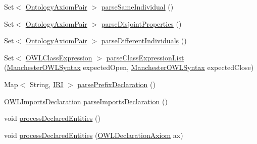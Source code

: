\begin{DoxyCompactItemize}
\item 
Set$<$ \hyperlink{classorg_1_1coode_1_1owlapi_1_1manchesterowlsyntax_1_1_ontology_axiom_pair}{Ontology\-Axiom\-Pair} $>$ \hyperlink{classorg_1_1coode_1_1owlapi_1_1manchesterowlsyntax_1_1_manchester_o_w_l_syntax_editor_parser_a6c2b270d7163b4156eeac5839ff7728a}{parse\-Same\-Individual} ()
\item 
Set$<$ \hyperlink{classorg_1_1coode_1_1owlapi_1_1manchesterowlsyntax_1_1_ontology_axiom_pair}{Ontology\-Axiom\-Pair} $>$ \hyperlink{classorg_1_1coode_1_1owlapi_1_1manchesterowlsyntax_1_1_manchester_o_w_l_syntax_editor_parser_a5896329f8f4aece049291391224239c0}{parse\-Disjoint\-Properties} ()
\item 
Set$<$ \hyperlink{classorg_1_1coode_1_1owlapi_1_1manchesterowlsyntax_1_1_ontology_axiom_pair}{Ontology\-Axiom\-Pair} $>$ \hyperlink{classorg_1_1coode_1_1owlapi_1_1manchesterowlsyntax_1_1_manchester_o_w_l_syntax_editor_parser_a194d6d1b4588538aa9a00e3279ff4821}{parse\-Different\-Individuals} ()
\item 
Set$<$ \hyperlink{interfaceorg_1_1semanticweb_1_1owlapi_1_1model_1_1_o_w_l_class_expression}{O\-W\-L\-Class\-Expression} $>$ \hyperlink{classorg_1_1coode_1_1owlapi_1_1manchesterowlsyntax_1_1_manchester_o_w_l_syntax_editor_parser_a515a71c10afb8d0d15b0db9d9b97407a}{parse\-Class\-Expression\-List} (\hyperlink{enumorg_1_1coode_1_1owlapi_1_1manchesterowlsyntax_1_1_manchester_o_w_l_syntax}{Manchester\-O\-W\-L\-Syntax} expected\-Open, \hyperlink{enumorg_1_1coode_1_1owlapi_1_1manchesterowlsyntax_1_1_manchester_o_w_l_syntax}{Manchester\-O\-W\-L\-Syntax} expected\-Close)
\item 
Map$<$ String, \hyperlink{classorg_1_1semanticweb_1_1owlapi_1_1model_1_1_i_r_i}{I\-R\-I} $>$ \hyperlink{classorg_1_1coode_1_1owlapi_1_1manchesterowlsyntax_1_1_manchester_o_w_l_syntax_editor_parser_a0b0b04fc1e7f555ee999c9b0655a1ed8}{parse\-Prefix\-Declaration} ()
\item 
\hyperlink{interfaceorg_1_1semanticweb_1_1owlapi_1_1model_1_1_o_w_l_imports_declaration}{O\-W\-L\-Imports\-Declaration} \hyperlink{classorg_1_1coode_1_1owlapi_1_1manchesterowlsyntax_1_1_manchester_o_w_l_syntax_editor_parser_ae7006e1803ee09dfa52970337be28c47}{parse\-Imports\-Declaration} ()
\item 
void \hyperlink{classorg_1_1coode_1_1owlapi_1_1manchesterowlsyntax_1_1_manchester_o_w_l_syntax_editor_parser_a3351f3e616e3260aef057e229b48138a}{process\-Declared\-Entities} ()
\item 
void \hyperlink{classorg_1_1coode_1_1owlapi_1_1manchesterowlsyntax_1_1_manchester_o_w_l_syntax_editor_parser_a573a3b809484ec8a16e07141c2fc8c4e}{process\-Declared\-Entities} (\hyperlink{interfaceorg_1_1semanticweb_1_1owlapi_1_1model_1_1_o_w_l_declaration_axiom}{O\-W\-L\-Declaration\-Axiom} ax)

\end{DoxyCompactItemize}
